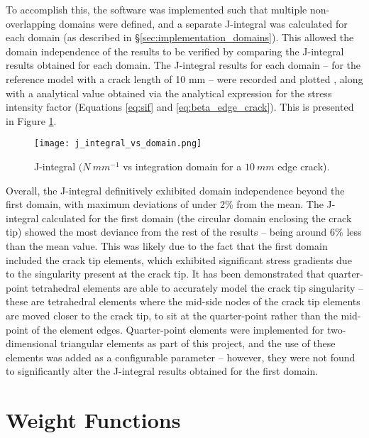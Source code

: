 To accomplish this, the software was implemented such that multiple non-overlapping domains were defined, and a separate J-integral was calculated for each domain (as described in §\ref{sec:implementation_domains}). This allowed the domain independence of the results to be verified by comparing the J-integral results obtained for each domain. The J-integral results for each domain -- for the reference model with a crack length of 10 mm -- were recorded and plotted , along with a analytical value obtained via the analytical expression for the stress intensity factor (Equations \ref{eq:sif} and \ref{eq:beta_edge_crack}). This is presented in Figure \ref{fig:j_integral_vs_domain}.

\begin{figure}[H]
	\centering
	\texttt{[image: j\_integral\_vs\_domain.png]}
	\caption{J-integral $(N\ mm^{-1}$ vs integration domain for a $10\ mm$ edge crack).}
	\label{fig:j_integral_vs_domain}
\end{figure}

Overall, the J-integral definitively exhibited domain independence beyond the first domain, with maximum deviations of under 2\% from the mean. The J-integral calculated for the first domain (the circular domain enclosing the crack tip) showed the most deviance from the rest of the results -- being around 6\% less than the mean value. This was likely due to the fact that the first domain included the crack tip elements, which exhibited significant stress gradients due to the singularity present at the crack tip. It has been demonstrated that quarter-point tetrahedral elements are able to accurately model the crack tip singularity \cite{nejati_use_2015} -- these are tetrahedral elements where the mid-side nodes of the crack tip elements are moved closer to the crack tip, to sit at the quarter-point rather than the mid-point of the element edges. Quarter-point elements were implemented for two-dimensional triangular elements as part of this project, and the use of these elements was added as a configurable parameter -- however, they were not found to significantly alter the J-integral results obtained for the first domain.

\section{Weight Functions}

